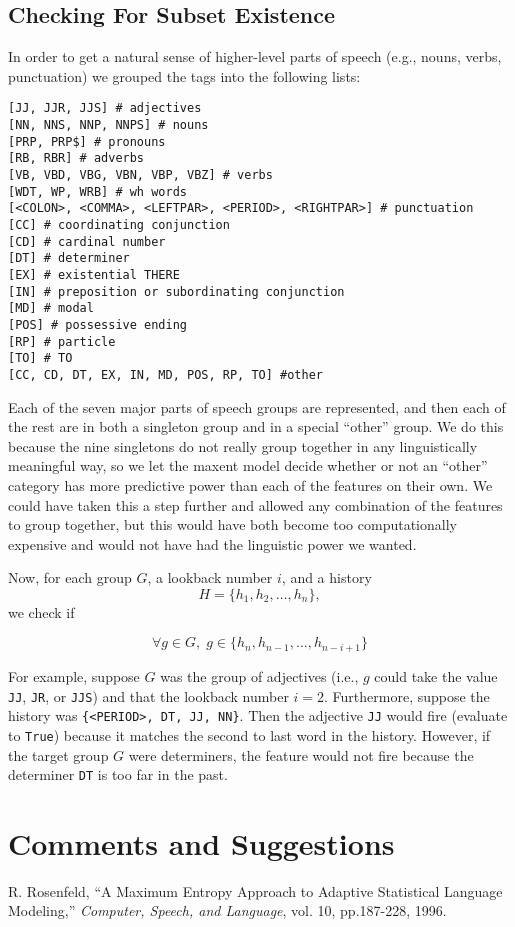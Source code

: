 \documentclass[11pt]{article}
\begin{document}
\subsection{Checking For Subset Existence}
\label{sec:subset-existence}

In order to get a natural sense of higher-level parts of speech (e.g., nouns, verbs, punctuation) we grouped the tags into the following lists:

\begin{verbatim}
[JJ, JJR, JJS] # adjectives
[NN, NNS, NNP, NNPS] # nouns
[PRP, PRP$] # pronouns
[RB, RBR] # adverbs
[VB, VBD, VBG, VBN, VBP, VBZ] # verbs
[WDT, WP, WRB] # wh words
[<COLON>, <COMMA>, <LEFTPAR>, <PERIOD>, <RIGHTPAR>] # punctuation
[CC] # coordinating conjunction
[CD] # cardinal number
[DT] # determiner
[EX] # existential THERE
[IN] # preposition or subordinating conjunction
[MD] # modal
[POS] # possessive ending
[RP] # particle
[TO] # TO
[CC, CD, DT, EX, IN, MD, POS, RP, TO] #other
\end{verbatim}

Each of the seven major parts of speech groups are represented, and then each
of the rest are in both a singleton group and in a special ``other'' group. We
do this because the nine singletons do not really group together in any
linguistically meaningful way, so we let the maxent model decide whether or
not an ``other'' category has more predictive power than each of the features
on their own. We could have taken this a step further and allowed any
combination of the features to group together, but this would have both become
too computationally expensive and would not have had the linguistic power we
wanted.

Now, for each group $G$, a lookback number $i$, and a history \[ H = \{h_1,
h_2, \dots, h_n\},\] we check if

\[ \forall g \in G,\; g \in \{h_{n}, h_{n-1}, \ldots, h_{n-i+1}\}  \]

For example, suppose $G$ was the group of adjectives (i.e., $g$ could take the
value \texttt{JJ}, \texttt{JR}, or \texttt{JJS}) and that the lookback number
$i = 2$. Furthermore, suppose the history was \texttt{\{<PERIOD>, DT, JJ,
NN\}}. Then the adjective \texttt{JJ} would fire (evaluate to \texttt{True})
because it matches the second to last word in the history. However, if the
target group $G$ were determiners, the feature would not fire because the
determiner \texttt{DT} is too far in the past.

\section{Comments and Suggestions}


\begin{thebibliography}{}

R. Rosenfeld,
``A Maximum Entropy Approach to Adaptive Statistical Language Modeling,''
{\em Computer, Speech, and Language}, vol. 10, pp.187-228, 1996.

\end{thebibliography}
\end{document}
